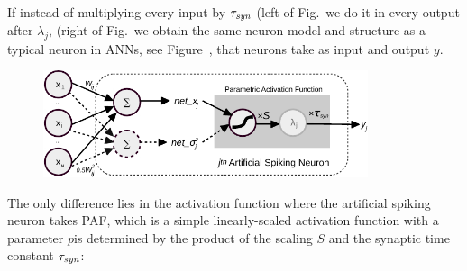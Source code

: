 	
	If instead of multiplying every input \DIFaddbegin {}\DIFaddend by $\tau_{\textit{\textrm{syn}}}$ (left of Fig.~\DIFdelbegin {}\DIFdelend \DIFaddbegin \DIFadd{\ref{Fig:tneuron_a}) }\DIFaddend we do it in every output \DIFaddbegin {}\DIFaddend after $\lambda_j$, (right of Fig.~\DIFdelbegin {}\DIFdelend \DIFaddbegin \DIFadd{\ref{Fig:tneuron_b}) }\DIFaddend we obtain the same neuron model and structure as a typical neuron in ANNs, see Figure~\DIFdelbegin {}\DIFdelend \DIFaddbegin \DIFadd{\ref{Fig:tneuron_c}}\DIFaddend , that neurons take \DIFdelbegin {}\DIFdelend \DIFaddbegin {}\DIFaddend as input and output \DIFaddbegin {}\DIFaddend $y$.
	\DIFaddbegin 

	\begin{figure}[bt]
		\centering
		\includegraphics[width=0.85\textwidth]{pics_iconip/neuron_PAF.pdf}
		\caption[An artificial spiking neuron modelled by PAF-NSP.]{}
		\label{Fig:tneuron_b}
	\end{figure}

	\DIFaddend %
	The only difference lies in the activation function where the artificial spiking neuron takes PAF, which is a simple linearly-scaled activation function with a parameter $p$\DIFdelbegin {}\DIFdelend \DIFaddbegin {}\DIFaddend is determined by the product of the scaling \DIFdelbegin {}\DIFdelend \DIFaddbegin {}\DIFaddend $S$ and the synaptic time constant $\tau_{\textit{\textrm{syn}}}$:
	\DIFdelbegin %

